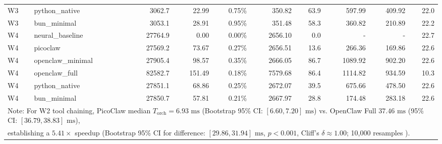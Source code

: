 \begin{table}[t]
\begin{tabular}{llrrrrrrrr}
W3 & python\_native & 3062.7 & 22.99 & 0.75\% & 350.82 & 63.9 & 597.99 & 409.92 & 22.0 \\
W3 & bun\_minimal & 3053.1 & 28.91 & 0.95\% & 351.48 & 58.3 & 360.82 & 210.89 & 22.2 \\
\midrule
W4 & neural\_baseline & 27764.9 & 0.00 & 0.00\% & 2656.10 & 0.0 & - & - & 22.7 \\
W4 & picoclaw & 27569.2 & 73.67 & 0.27\% & 2656.51 & 13.6 & 266.36 & 169.86 & 22.6 \\
W4 & openclaw\_minimal & 27905.4 & 98.57 & 0.35\% & 2666.05 & 86.7 & 1089.92 & 902.20 & 22.6 \\
W4 & openclaw\_full & 82582.7 & 151.49 & 0.18\% & 7579.68 & 86.4 & 1114.82 & 934.59 & 10.3 \\
W4 & python\_native & 27851.1 & 68.86 & 0.25\% & 2672.07 & 39.5 & 675.66 & 478.50 & 22.6 \\
W4 & bun\_minimal & 27850.7 & 57.81 & 0.21\% & 2667.97 & 28.8 & 174.48 & 283.18 & 22.6 \\
\midrule
\multicolumn{10}{l}{\footnotesize Note: For W2 tool chaining, PicoClaw median $T_{\text{orch}} = 6.93\text{ ms}$ (Bootstrap 95\% CI: $[6.60, 7.20]\text{ ms}$) vs. OpenClaw Full $37.46\text{ ms}$ (95\% CI: $[36.79, 38.83]\text{ ms}$),} \\
\multicolumn{10}{l}{\footnotesize establishing a $5.41\times$ speedup (Bootstrap 95\% CI for difference: $[29.86, 31.94]\text{ ms}$, $p < 0.001$, Cliff's $\delta \approx 1.00$; 10,000 resamples \cite{efron1979}).} \\
\bottomrule
\end{tabular}
\end{table}
